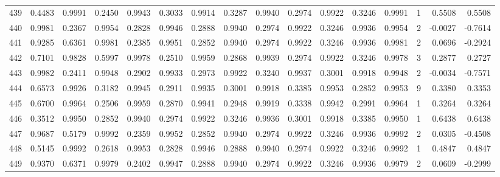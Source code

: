 \begin{tabular}{lrrrrrrrrrrrrrrr}
439 &      0.4483 &  0.9991 &  0.2450 &  0.9943 &  0.3033 &  0.9914 &  0.3287 &  0.9940 &  0.2974 &  0.9922 &   0.3246 &     0.9991 &      1 &                    0.5508 &                     0.5508 \\
440 &      0.9981 &  0.2367 &  0.9954 &  0.2828 &  0.9946 &  0.2888 &  0.9940 &  0.2974 &  0.9922 &  0.3246 &   0.9936 &     0.9954 &      2 &                   -0.0027 &                    -0.7614 \\
441 &      0.9285 &  0.6361 &  0.9981 &  0.2385 &  0.9951 &  0.2852 &  0.9940 &  0.2974 &  0.9922 &  0.3246 &   0.9936 &     0.9981 &      2 &                    0.0696 &                    -0.2924 \\
442 &      0.7101 &  0.9828 &  0.5997 &  0.9978 &  0.2510 &  0.9959 &  0.2868 &  0.9939 &  0.2974 &  0.9922 &   0.3246 &     0.9978 &      3 &                    0.2877 &                     0.2727 \\
443 &      0.9982 &  0.2411 &  0.9948 &  0.2902 &  0.9933 &  0.2973 &  0.9922 &  0.3240 &  0.9937 &  0.3001 &   0.9918 &     0.9948 &      2 &                   -0.0034 &                    -0.7571 \\
444 &      0.6573 &  0.9926 &  0.3182 &  0.9945 &  0.2911 &  0.9935 &  0.3001 &  0.9918 &  0.3385 &  0.9953 &   0.2852 &     0.9953 &      9 &                    0.3380 &                     0.3353 \\
445 &      0.6700 &  0.9964 &  0.2506 &  0.9959 &  0.2870 &  0.9941 &  0.2948 &  0.9919 &  0.3338 &  0.9942 &   0.2991 &     0.9964 &      1 &                    0.3264 &                     0.3264 \\
446 &      0.3512 &  0.9950 &  0.2852 &  0.9940 &  0.2974 &  0.9922 &  0.3246 &  0.9936 &  0.3001 &  0.9918 &   0.3385 &     0.9950 &      1 &                    0.6438 &                     0.6438 \\
447 &      0.9687 &  0.5179 &  0.9992 &  0.2359 &  0.9952 &  0.2852 &  0.9940 &  0.2974 &  0.9922 &  0.3246 &   0.9936 &     0.9992 &      2 &                    0.0305 &                    -0.4508 \\
448 &      0.5145 &  0.9992 &  0.2618 &  0.9953 &  0.2828 &  0.9946 &  0.2888 &  0.9940 &  0.2974 &  0.9922 &   0.3246 &     0.9992 &      1 &                    0.4847 &                     0.4847 \\
449 &      0.9370 &  0.6371 &  0.9979 &  0.2402 &  0.9947 &  0.2888 &  0.9940 &  0.2974 &  0.9922 &  0.3246 &   0.9936 &     0.9979 &      2 &                    0.0609 &                    -0.2999 \\

\end{tabular}
